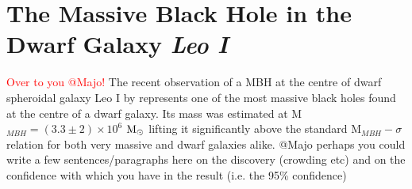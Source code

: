 \documentclass[twocolumn, tighten]{aastex631}
\newcommand{\msolar} {$\rm{M_{\odot}}~$}
\begin{document}
\section{The Massive Black Hole in the Dwarf Galaxy \textit{Leo I}} \label{Sec:LeoI}
\noindent \textcolor{red}{Over to you @Majo!}
The recent observation of a MBH at the centre of dwarf spheroidal galaxy Leo I by \cite{Bustamante-Rosell_2021} represents one of the most massive black holes found at the centre of
a dwarf galaxy. Its mass was estimated at M$_{MBH} = (3.3 \pm 2) \times 10^6$ \msolar lifting
it significantly above the standard M$_{MBH} - \sigma$ relation \citep{Kormendy_2013, Baldassare_2020, Greene_2020} for both very massive and dwarf galaxies alike. 
@Majo perhaps you could write a few sentences/paragraphs here on the discovery (crowding etc) and on the 
confidence with which you have in the result (i.e. the 95\% confidence)
\end{document}
